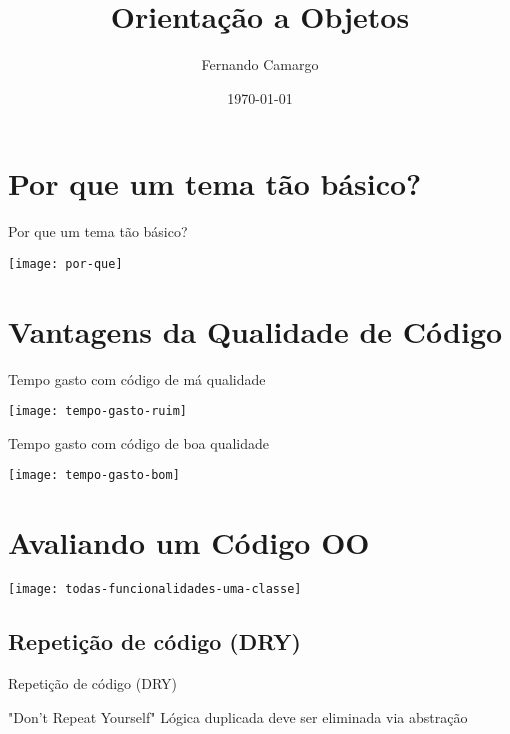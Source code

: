\documentclass{beamer}
\title{Orientação a Objetos}
\date{\today}
\author{Fernando Camargo}
\institute{ZG Soluções}
\begin{document}
\maketitle

\section{Por que um tema tão básico?}

\begin{frame}{Por que um tema tão básico?}
  \begin{center}
    \texttt{[image: por-que]}
  \end{center}
\end{frame}

\section{Vantagens da Qualidade de Código}

\begin{frame}{Tempo gasto com código de má qualidade}
  \begin{center}
    \texttt{[image: tempo-gasto-ruim]}
  \end{center}
\end{frame}

\begin{frame}{Tempo gasto com código de boa qualidade}
  \begin{center}
    \texttt{[image: tempo-gasto-bom]}
  \end{center}
\end{frame}

\section{Avaliando um Código OO}

\begin{frame}
  \begin{center}
    \texttt{[image: todas-funcionalidades-uma-classe]}
  \end{center}
\end{frame}

\subsection{Repetição de código (DRY)}

\begin{frame}{Repetição de código (DRY)}
 \begin{outline}
    "Don't Repeat Yourself"
    Lógica duplicada deve ser eliminada via abstração
 \end{outline}
\end{frame}
\end{document}
